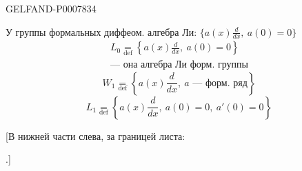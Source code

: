 \begin{GelfandAdjacentEvidence}{GELFAND-P000783}{4}

У группы формальных диффеом. алгебра Ли:
\(\{a(x)\tfrac{d}{dx},\ a(0)=0\}\)
\begin{equation}
\begin{gathered}
L_0\underset{\mathrm{def}}{=}
\left\{a(x)\frac{d}{dx},\ a(0)=0\right\}\\
\text{--- она алгебра Ли форм. группы}
\end{gathered}\tag{7}
\end{equation}
\begin{equation}
W_1\underset{\mathrm{def}}{=}
\left\{a(x)\frac{d}{dx},\ a\text{ --- форм. ряд}\right\}\tag{8}
\end{equation}
\begin{equation}
L_1\underset{\mathrm{def}}{=}
\left\{a(x)\frac{d}{dx},\ a(0)=0,\ a'(0)=0\right\}\tag{9}
\end{equation}

[В нижней части слева, за границей листа:
\end{GelfandAdjacentEvidence}
.]


